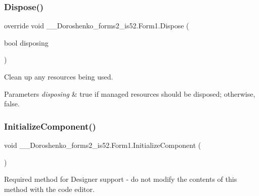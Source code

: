 \subsubsection{\texorpdfstring{Dispose()}{Dispose()}}
{\footnotesize\ttfamily override void \+\_\+\_\+\+Doroshenko\+\_\+forms2\+\_\+is52.\+Form1.\+Dispose (\begin{DoxyParamCaption}\item[{bool}]{disposing }\end{DoxyParamCaption})\hspace{0.3cm}{\ttfamily [protected]}}



Clean up any resources being used. 


\begin{DoxyParams}{Parameters}
{\em disposing} & true if managed resources should be disposed; otherwise, false.\\
\hline
\end{DoxyParams}
\hypertarget{class__7___doroshenko__forms2__is52_1_1_form1_a5f037fdde44f5c3dff59d46faa2cb99f}{}\label{class__7___doroshenko__forms2__is52_1_1_form1_a5f037fdde44f5c3dff59d46faa2cb99f} 
\subsubsection{\texorpdfstring{Initialize\+Component()}{InitializeComponent()}}
{\footnotesize\ttfamily void \+\_\+\_\+\+Doroshenko\+\_\+forms2\+\_\+is52.\+Form1.\+Initialize\+Component (\begin{DoxyParamCaption}{ }\end{DoxyParamCaption})\hspace{0.3cm}{\ttfamily [private]}}



Required method for Designer support -\/ do not modify the contents of this method with the code editor. 

